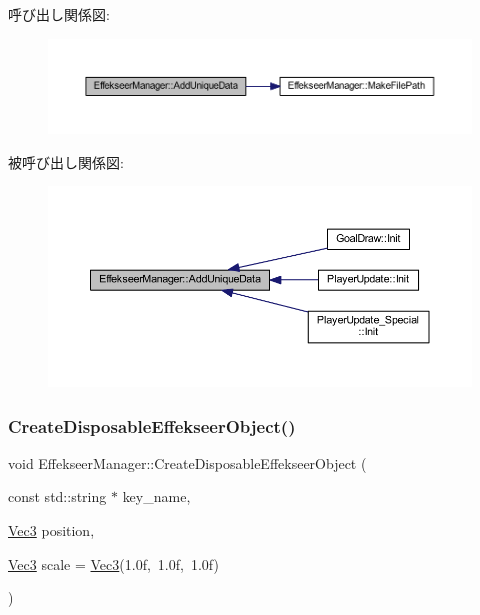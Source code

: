 呼び出し関係図\+:\nopagebreak
\begin{figure}[H]
\begin{center}
\leavevmode
\includegraphics[width=350pt]{class_effekseer_manager_ad89f0ad2a840f191c088d35ddfd2ec62_cgraph}
\end{center}
\end{figure}
被呼び出し関係図\+:\nopagebreak
\begin{figure}[H]
\begin{center}
\leavevmode
\includegraphics[width=350pt]{class_effekseer_manager_ad89f0ad2a840f191c088d35ddfd2ec62_icgraph}
\end{center}
\end{figure}
\mbox{\label{class_effekseer_manager_a0b82fe25fbe1dacc0d904fb54267b2fa}} 
\subsubsection{\texorpdfstring{Create\+Disposable\+Effekseer\+Object()}{CreateDisposableEffekseerObject()}}
{\footnotesize\ttfamily void Effekseer\+Manager\+::\+Create\+Disposable\+Effekseer\+Object (\begin{DoxyParamCaption}\item[{const std\+::string $\ast$}]{key\+\_\+name,  }\item[{\mbox{\hyperlink{_vector3_d_8h_ab16f59e4393f29a01ec8b9bbbabbe65d}{Vec3}}}]{position,  }\item[{\mbox{\hyperlink{_vector3_d_8h_ab16f59e4393f29a01ec8b9bbbabbe65d}{Vec3}}}]{scale = {\ttfamily \mbox{\hyperlink{_vector3_d_8h_ab16f59e4393f29a01ec8b9bbbabbe65d}{Vec3}}(1.0f,~1.0f,~1.0f)} }\end{DoxyParamCaption})\hspace{0.3cm}{\ttfamily [static]}}



